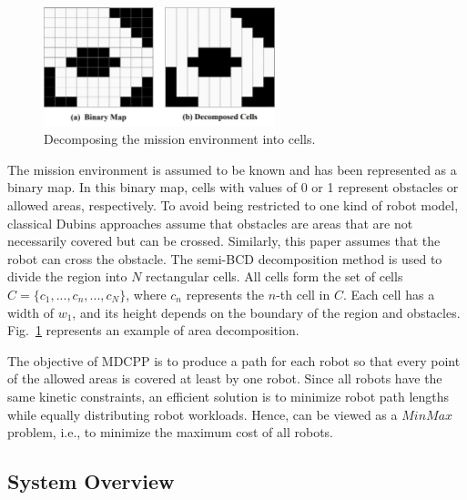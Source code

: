 \documentclass[journal,article,submit,pdftex,moreauthors]{Definitions/mdpi}
\begin{document}
\begin{figure}[htb] %
	\centering  %
    \vspace{0 cm} %
    \includegraphics[width=0.6\textwidth]{1.jpg}
    \caption{ Decomposing the mission environment into cells.}
   \label{Fig_area_decomposition}
\end{figure}

The mission environment is assumed to be known and has been represented as a binary map. In this binary map, cells with values of 0 or 1 represent obstacles or allowed areas, respectively. To avoid being restricted to one kind of robot model, classical Dubins approaches \cite{c46}\cite{c56} assume that obstacles are areas that are not necessarily covered but can be crossed. Similarly, this paper assumes that the robot can cross the obstacle. The semi-BCD decomposition \cite{c56} method is used to divide the region into $N$ rectangular cells. All cells form the set of cells $C =\{ c_1,...,c_n,...,c_N\}$, where $c_n$ represents the $n$-th cell in $C$. Each cell has a width of $w_1$, and its height depends on the boundary of the region and obstacles. Fig.~\ref{Fig_area_decomposition} represents an example of area decomposition.

The objective of MDCPP is to produce a path for each robot so that every point of the allowed areas is covered at least by one robot. Since all robots have the same kinetic constraints, an efficient solution is to minimize robot path lengths while equally distributing robot workloads. Hence,  can be viewed as a $MinMax$ problem, i.e., to minimize the maximum cost of all robots.

\subsection{System Overview}
\end{document}
